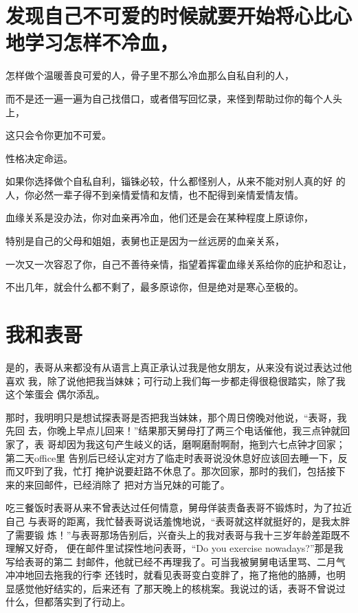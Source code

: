 \documentclass[12pt]{book}
\begin{document}
\section{发现自己不可爱的时候就要开始将心比心地学习怎样不冷血，}
\label{sec-9-84}

怎样做个温暖善良可爱的人，骨子里不那么冷血那么自私自利的人，

而不是还一遍一遍为自己找借口，或者借写回忆录，来怪到帮助过你的每个人头上，

这只会令你更加不可爱。

性格决定命运。

如果你选择做个自私自利，锱铢必较，什么都怪别人，从来不能对别人真的好
的人，你必然一辈子得不到亲情爱情和友情，也不配得到亲情爱情友情。

血缘关系是没办法，你对血亲再冷血，他们还是会在某种程度上原谅你，

特别是自己的父母和姐姐，表舅也正是因为一丝远房的血亲关系，

一次又一次容忍了你，自己不善待亲情，指望着挥霍血缘关系给你的庇护和忍让，

不出几年，就会什么都不剩了，最多原谅你，但是绝对是寒心至极的。
\section{我和表哥}
\label{sec-9-85}

是的，表哥从来都没有从语言上真正承认过我是他女朋友，从来没有说过表达过他喜欢
我，除了说他把我当妹妹；可行动上我们每一步都走得很稳很踏实，除了我这个笨蛋会
偶尔添乱。

那时，我明明只是想试探表哥是否把我当妹妹，那个周日傍晚对他说，“表哥，我先回
去，你晚上早点儿回来！”结果那天舅母打了两三个电话催他，我三点钟就回家了，表
哥却因为我这句产生岐义的话，磨啊磨耐啊耐，拖到六七点钟才回家；第二天office里
告别后已经认定对方了临走时表哥说没休息好应该回去睡一下，反而又吓到了我，忙打
掩护说要赶路不休息了。那次回家，那时的我们，包括接下来的来回邮件，已经消除了
把对方当兄妹的可能了。

吃三餐饭时表哥从来不曾表达过任何情意，舅母佯装责备表哥不锻炼时，为了拉近自己
与表哥的距离，我忙替表哥说话羞愧地说，“表哥就这样就挺好的，是我太胖了需要锻
炼！”与表哥那场告别后，兴奋头上的我对表哥与我十三岁年龄差距既不理解又好奇，
便在邮件里试探性地问表哥，“Do you exercise nowadays?”那是我写给表哥的第二
封邮件，他就已经不再理我了。可当我被舅舅电话里骂、二月气冲冲地回去拖我的行李
还钱时，就看见表哥变白变胖了，拖了拖他的胳膊，也明显感觉他好结实的，后来还有
了那天晚上的核桃案。我说过的话，表哥不曾说过什么，但都落实到了行动上。
\end{document}
